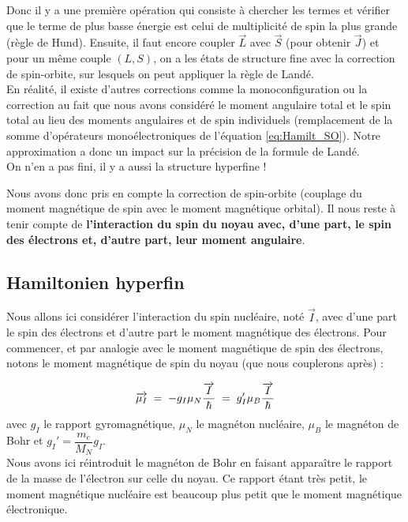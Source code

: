 Donc il y a une première opération qui consiste à chercher les termes et vérifier que le terme de plus basse énergie est celui de multiplicité de spin la plus grande (règle de Hund). Ensuite, il faut encore coupler $\overrightarrow{L}$ avec $\overrightarrow{S}$ (pour obtenir $\overrightarrow{J}$) et pour un même couple $(L,S)$, on a les états de structure fine avec la correction de spin-orbite, sur lesquels on peut appliquer la règle de Landé.\\
En réalité, il existe d'autres corrections comme la monoconfiguration ou la correction au fait que nous avons considéré le moment angulaire total et le spin total au lieu des moments angulaires et de spin individuels (remplacement de la somme d'opérateurs monoélectroniques de l'équation \eqref{eq:Hamilt_SO}). Notre approximation a donc un impact sur la précision de la formule de Landé.\\
On n’en a pas fini, il y a aussi la structure hyperfine !

Nous avons donc pris en compte la correction de spin-orbite (couplage du moment magnétique de spin avec le moment magnétique orbital). Il nous reste à tenir compte de \textbf{l’interaction du spin du noyau avec, d'une part, le spin des électrons et, d'autre part, leur moment angulaire}. 



    \subsection{Hamiltonien hyperfin}
    
    

Nous allons ici considérer l'interaction du spin nucléaire, noté $\overrightarrow{I}$, avec d'une part le spin des électrons et d'autre part le moment magnétique des électrons. Pour commencer, et par analogie avec le moment magnétique de spin des électrons, notons le moment magnétique de spin du noyau (que nous couplerons après) :

\begin{equation}
    \overrightarrow{\mu_I}
    \; = \; -g_I\mu_N\dfrac{\overrightarrow{I}}{\hbar}
    \; = \;  g_I'\mu_B\dfrac{\overrightarrow{I}}{\hbar}
    \label{eq:momt_magn_nucl}
\end{equation}
avec $g_I$ le rapport gyromagnétique, $\mu_N$ le magnéton nucléaire, $\mu_B$ le magnéton de Bohr et $g_I'=\dfrac{m_e}{M_N}g_I$.\\
Nous avons ici réintroduit le magnéton de Bohr en faisant apparaître le rapport de la masse de l’électron sur celle du noyau. Ce rapport étant très petit, le moment magnétique nucléaire est beaucoup plus petit que le moment magnétique électronique.\\

